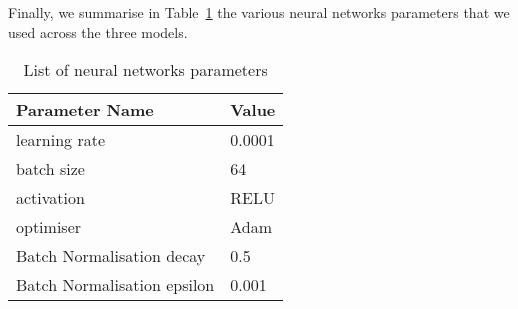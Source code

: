 \documentclass[conference]{IEEEtran}
\begin{document}
Finally, we summarise in Table~\ref{table:parameters} the various neural networks parameters that we used across the three models.
	\begin{table}[h!]
\centering
\caption{List of neural networks parameters}
\label{table:parameters}
\begin{tabular}{  ll   }
 \toprule
  \textbf{Parameter Name}&\textbf{Value} \\
 \midrule
learning rate & 0.0001\\
batch size & 64\\
activation & RELU\\
optimiser & Adam\\
Batch Normalisation decay & 0.5\\
Batch Normalisation epsilon & 0.001\\
 \bottomrule
\end{tabular}
\end{table}
	
\end{document}
